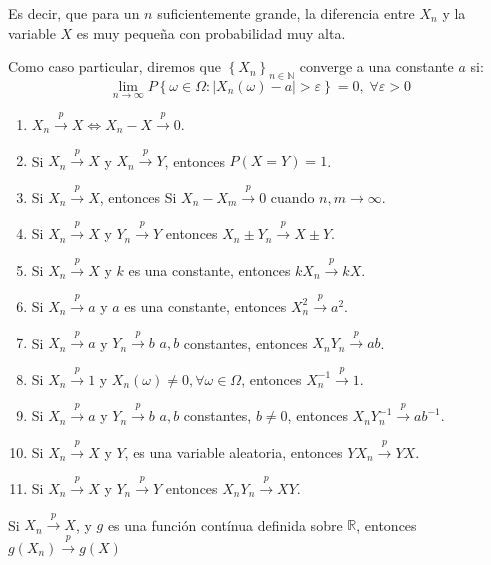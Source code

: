 Es decir, que para un $ n $ suficientemente grande, la diferencia entre $ X_n $ y la variable $ X $ es muy peque\~na con probabilidad muy alta.

Como caso particular, diremos que $ \left\{X_n\right\}_{n\in\mathbb{N}} $ converge a una constante $ a $ si:
\begin{equation}
\lim_{n\rightarrow\infty}P\left\{ \omega\in\Omega:\left|X_{n}(\omega)-a\right|>\varepsilon\right\} =0, \;\forall\varepsilon>0
\end{equation}


\begin{enumerate}
\item $X_{n} \overset{p}{\to} X \Leftrightarrow X_{n}-X \overset{p}{\to} 0 $.
\item Si $X_{n} \overset{p}{\to} X $ y $X_{n} \overset{p}{\to} Y $, entonces $P\left(X=Y\right)=1$.
\item Si $X_{n} \overset{p}{\to} X $, entonces Si $X_{n}-X_{m} \overset{p}{\to} 0 $ cuando $n,m\to\infty$.
\item Si $X_{n} \overset{p}{\to} X $ y $Y_{n} \overset{p}{\to} Y $ entonces $X_{n}\pm Y_{n} \overset{p}{\to} X\pm Y $.
\item Si $X_{n} \overset{p}{\to} X $ y $k$ es una constante, entonces $kX_{n} \overset{p}{\to} kX $.
\item Si $X_{n} \overset{p}{\to} a $ y $a$ es una constante, entonces $X_{n}^2 \overset{p}{\to} a^2 $.
\item Si $X_{n} \overset{p}{\to} a $ y $Y_{n} \overset{p}{\to} b $  $a,b$ constantes, entonces $X_{n}Y_{n} \overset{p}{\to} ab $.
\item Si $X_{n} \overset{p}{\to} 1 $ y $X_{n}(\omega)\neq 0, \forall\omega\in\Omega$, entonces $X_{n}^{-1} \overset{p}{\to} 1 $.
\item Si $X_{n} \overset{p}{\to} a $ y $Y_{n} \overset{p}{\to} b $  $a,b$ constantes, $b\neq0$, entonces $X_{n}Y_{n}^{-1} \overset{p}{\to} ab^{-1} $.
\item Si $X_{n} \overset{p}{\to} X $ y $ Y $, es una variable aleatoria, entonces $YX_{n} \overset{p}{\to} YX $.
\item Si $X_{n} \overset{p}{\to} X $ y $Y_{n} \overset{p}{\to} Y $ entonces $X_{n}Y_{n} \overset{p}{\to} XY $.
\end{enumerate}

\begin{teorema}
Si $X_{n} \overset{p}{\to} X $, y $g$ es una funci\'on cont\'inua definida sobre $\mathbb{R}$, entonces $g(X_{n}) \overset{p}{\to} g(X) $
\end{teorema}

